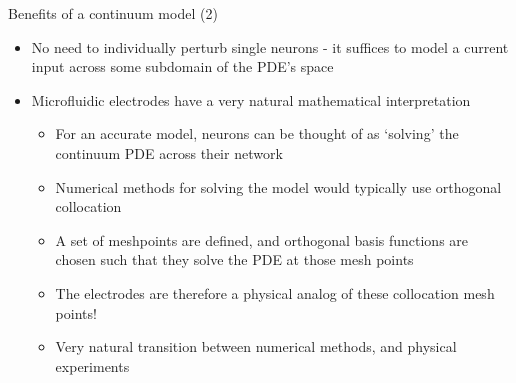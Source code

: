 \documentclass[presentation]{beamer}
\begin{document}
\begin{frame}[label={sec:org6502ccc}]{Benefits of a continuum model (2)}
\begin{itemize}
\item No need to individually perturb single neurons - it suffices to model a current input across some subdomain of the PDE's space
\item Microfluidic electrodes have a very natural mathematical interpretation
\begin{itemize}
\item For an accurate model, neurons can be thought of as `solving' the continuum PDE across their network
\item Numerical methods for solving the model would typically use orthogonal collocation
\item A set of meshpoints are defined, and orthogonal basis functions are chosen such that they solve the PDE at those mesh points
\item The electrodes are therefore a physical analog of these collocation mesh points!
\item Very natural transition between numerical methods, and physical experiments
\end{itemize}
\end{itemize}
\end{frame}
\end{document}

